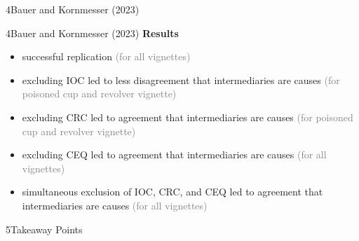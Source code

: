 \documentclass[xcolor=table,9pt,aspectratio=169]{beamer}
\begin{document}
\begin{frame}{\vspace*{10mm}4\hspace*{1em}Bauer and Kornmesser (2023)}
\begin{multicols}{2}
\begin{center}
\end{center}
\end{multicols}
\end{frame}


\begin{frame}{\vspace*{10mm}4\hspace*{1em}Bauer and Kornmesser (2023)}
\vspace*{-5mm}
\textbf{Results}\\
\begin{itemize}
   \item successful replication \textcolor{gray}{(for all vignettes)}
   \item excluding IOC led to less disagreement that intermediaries are causes \textcolor{gray}{(for poisoned cup and revolver vignette)}
   \item excluding CRC led to agreement that intermediaries are causes \textcolor{gray}{(for poisoned cup and revolver vignette)}
   \item excluding CEQ led to agreement that intermediaries are causes \textcolor{gray}{(for all vignettes)}
   \item simultaneous exclusion of IOC, CRC, and CEQ led to agreement that intermediaries are causes \textcolor{gray}{(for all vignettes)}
\end{itemize}
\end{frame}


\begin{frame}
\begin{overlayarea}{\textwidth}{0.81\paperheight}{
   \vspace*{11mm}
   \textcolor{uolblue}
   {5\hspace*{1em}Takeaway Points}
}
\end{overlayarea}
\end{frame}
\end{document}
